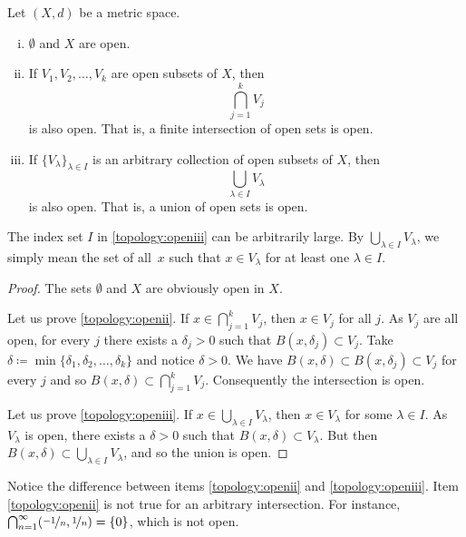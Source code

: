 \begin{prop} \label{prop:topology:open}
Let $(X,d)$ be a metric space.
\begin{enumerate}[(i)]
\item \label{topology:openi} $\emptyset$ and $X$ are open.
\item \label{topology:openii} If $V_1, V_2, \ldots, V_k$ are open subsets of $X$, then
\begin{equation*}
\bigcap_{j=1}^k V_j
\end{equation*}
is also open.  That is, a finite intersection of open sets is open.
\item \label{topology:openiii} If $\{ V_\lambda \}_{\lambda \in I}$ is
an arbitrary collection of open subsets of $X$, then
\begin{equation*}
\bigcup_{\lambda \in I} V_\lambda
\end{equation*}
is also open.  That is, a union of open sets is open.
\end{enumerate}
\end{prop}

The index set $I$ in \ref{topology:openiii} can be arbitrarily large.
By $\bigcup_{\lambda \in I} V_\lambda$, we simply mean the set of
all~$x$ such that $x \in V_\lambda$ for at least one $\lambda \in I$.

\begin{proof}
The sets $\emptyset$ and $X$ are obviously open in $X$.

Let us prove \ref{topology:openii}.
If $x \in \bigcap_{j=1}^k V_j$, then $x \in V_j$ for all $j$.
As $V_j$ are all open, for every $j$ there exists a $\delta_j > 0$ 
such that $B(x,\delta_j) \subset V_j$.  Take $\delta \coloneqq \min \{
\delta_1,\delta_2,\ldots,\delta_k \}$ and notice $\delta > 0$.  We have
$B(x,\delta) \subset B(x,\delta_j) \subset V_j$ for every $j$ and so
$B(x,\delta) \subset \bigcap_{j=1}^k V_j$.  Consequently the intersection is open.

Let us prove \ref{topology:openiii}.
If $x \in \bigcup_{\lambda \in I} V_\lambda$, then $x \in V_\lambda$ for some
$\lambda \in I$.
As $V_\lambda$ is open, there exists a $\delta > 0$
such that $B(x,\delta) \subset V_\lambda$.  But then
$B(x,\delta) \subset \bigcup_{\lambda \in I} V_\lambda$,
and so the union is open.
\end{proof}

\begin{example}
Notice the difference between
items
\ref{topology:openii} and \ref{topology:openiii}.
Item \ref{topology:openii} is not true for an arbitrary intersection.
For instance,
$\bigcap_{n=1}^\infty (\nicefrac{-1}{n},\nicefrac{1}{n}) = \{ 0 \}$,
which is not open.
\end{example}


